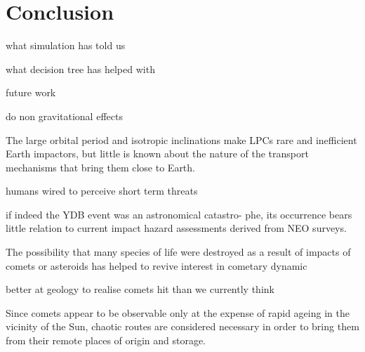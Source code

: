\chapter{Conclusion}
\label{chap:conclusion}

what simulation has told us

what decision tree has helped with

future work


do non gravitational effects


The large orbital period and isotropic inclinations make LPCs rare and inefficient Earth impactors, but little is known about the nature of the transport mechanisms that bring them close to Earth.

humans wired to perceive short term threats

if indeed the YDB event was an astronomical catastro-
phe, its occurrence bears little relation to current impact
hazard assessments derived from NEO surveys.

The 
possibility 
that 
many 
species 
of 
life 
were 
destroyed 
as 
a 
result 
of 
impacts 
of 
comets 
or 
asteroids 
has 
helped 
to 
revive 
interest 
in 
cometary 
dynamic

better at geology to realise comets hit than we currently think

 \cite{marks2015comets}
 
Since comets appear to be observable only at the expense of rapid ageing in the vicinity of the Sun, chaotic routes are considered necessary in order to bring them from their remote places of origin and storage.